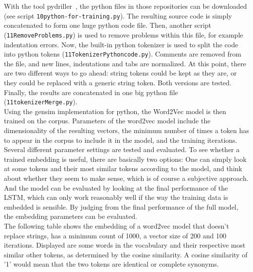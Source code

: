 \documentclass[
	a4paper,
	pagesize,
	pdftex,
	12pt,
	twoside, %
	BCOR=5mm, %
	ngerman,
	fleqn,
	final,
	]{scrartcl}
\begin{document}
\normalsize
With the tool pydriller~\cite{Spadini.2018}, the python files in those repositories can be downloaded (see script \texttt{10python-for-training.py}). The resulting source code is simply concatenated to form one huge python code file. Then, another script (\texttt{11RemoveProblems.py}) is used to remove problems within this file, for example indentation errors. Now, the built-in python tokenizer is used to split the code into python tokens (\texttt{11TokenizerPythoncode.py}). Comments are removed from the file, and new lines, indentations and tabs are normalized. At this point, there are two different ways to go ahead: string tokens could be kept as they are, or they could be replaced with a generic string token. Both versions are tested. Finally, the results are concatenated in one big python file (\texttt{11tokenizerMerge.py}).\\
Using the gensim implementation for python, the Word2Vec model is then trained on the corpus. Parameters of the word2vec model include the dimensionality of the resulting vectors, the minimum number of times a token has to appear in the corpus to include it in the model, and the training iterations. Several different parameter settings are tested and evaluated. To see whether a trained embedding is useful, there are basically two options: One can simply look at some tokens and their most similar tokens according to the model, and think about whether they seem to make sense, which is of course a subjective approach. And the model can be evaluated by looking at the final performance of the LSTM, which can only work reasonably well if the way the training data is embedded is sensible. By judging from the final performance of the full model, the embedding parameters can be evaluated.\\
The following table shows the embedding of a word2vec model that doesn't replace strings, has a minimum count of 1000, a vector size of 200 and 100 iterations. Displayed are some words in the vocabulary and their respective most similar other tokens, as determined by the cosine similarity. A cosine similarity of '1' would mean that the two tokens are identical or complete synonyms.
\end{document}
